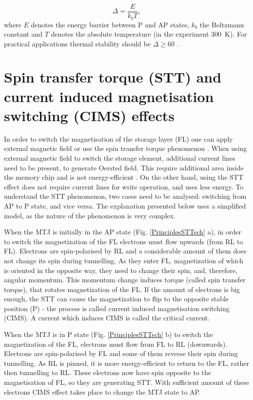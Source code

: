 	\begin{equation} \label{eq:TMRsatoDelta}
		\Delta = \frac{E}{k_bT},
	\end{equation}
where $E$ denotes the energy barrier between P and AP states, $k_b$ the Boltzmann constant and $T$ denotes the absolute temperature (in the experiment \SI{300}{\kelvin}). For practical applications thermal stability should be $\Delta \geq 60$ \cite{apalkov2010comparison}.

\section{Spin transfer torque (STT) and current induced magnetisation switching (CIMS) effects} \label{sec:PrinciplesCIMS}

    In order to switch the magnetisation of the storage layer (FL) one can apply external magnetic field or use the spin transfer torque phenomenon \cite{bhatti2017spintronics}. When using external magnetic field to switch the storage element, additional current lines need to be present, to generate Oersted field. This require additional area inside the memory chip and is not energy-efficient \cite{kent2015new,fujisaki2013review}. On the other hand, using the STT effect does not require current lines for write operation, and uses less energy. To understand the STT phenomenon, two cases need to be analysed: switching from AP to P state, and vice versa. The explanation presented below uses a simplified model, as the nature of the phenomenon is very complex.
    
    When the MTJ is initially in the AP state (Fig. \ref{PrinciplesSTTsch} a), in order to switch the magnetization of the FL electrons must flow upwards (from RL to FL). Electrons are spin-polarised by RL and a considerable amount of them does not change its spin during tunnelling. As they enter FL, magnetization of which is oriented in the opposite way, they need to change their spin, and, therefore, angular momentum. This momentum change induces torque (called spin transfer torque), that rotates magnetization of the FL. If the amount of electrons is big enough, the STT can cause the magnetization to flip to the opposite stable position (P) - the process is called current induced magnetisation switching (CIMS). A current which induces CIMS is called the critical current.
    
    When the MTJ is in P state (Fig. \ref{PrinciplesSTTsch} b) to switch the magnetization of the FL, electrons must flow from FL to RL (downwards). Electrons are spin-polarised by FL and some of them reverse their spin during tunnelling. As RL is pinned, it is more energy-efficient to return to the FL, rather then tunnelling to RL. These electrons now have spin opposite to the magnetisation of FL, so they are generating STT. With sufficient amount of these electrons CIMS effect takes place to change the MTJ state to AP.
    
